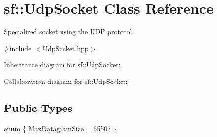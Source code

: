 \hypertarget{classsf_1_1_udp_socket}{}\section{sf\+:\+:Udp\+Socket Class Reference}
\label{classsf_1_1_udp_socket}


Specialized socket using the U\+DP protocol.  




{\ttfamily \#include $<$Udp\+Socket.\+hpp$>$}



Inheritance diagram for sf\+:\+:Udp\+Socket\+:


Collaboration diagram for sf\+:\+:Udp\+Socket\+:
\subsection*{Public Types}
\begin{DoxyCompactItemize}
\item 
enum \{ \hyperlink{classsf_1_1_udp_socket_a2478e00ccd252e67b0f70d5f5a5fce37a728a7d33027bee0d65f70f964dd9c9eb}{Max\+Datagram\+Size} = 65507
 \}
\end{DoxyCompactItemize}
